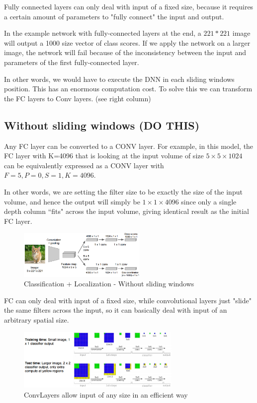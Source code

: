 Fully connected layers can only deal with input of a fixed size, because it requires a certain amount of parameters to "fully connect" the input and output.

In the example network with fully-connected layers at the end, a $221*221$ image will output a 1000 size vector of class scores. If we apply the network on a larger image, the network will fail because of the inconsistency between the input and parameters of the first fully-connected layer.

In other words, we would have to execute the DNN in each sliding windows position. This has an enormous computation cost. To solve this we can transform the FC layers to Conv layers. (see right column)

\subsection*{Without sliding windows (DO THIS)}

Any FC layer can be converted to a CONV layer. For example, in this model, the FC layer with K=4096 that is looking at the input volume of size $5 \times 5 \times 1024$ can be equivalently expressed as a CONV layer with $F=5,P=0,S=1,K=4096$.

In other words, we are setting the filter size to be exactly the size of the input volume, and hence the output will simply be $1 \times 1 \times 4096$ since only a single depth column ``fits" across the input volume, giving identical result as the initial FC layer.

\begin{figure}[h]
  \centering
  \includegraphics[width=0.55\textwidth]{Images/applications/9.png}
  \caption{Classification + Localization - Without sliding windows}
\end{figure}

FC can only deal with input of a fixed size, while convolutional layers just "slide" the same filters across the input, so it can basically deal with input of an arbitrary spatial size.

\begin{figure}[h]
  \centering
  \includegraphics[width=0.7\textwidth]{Images/applications/10.png}
  \caption{ConvLayers allow input of any size in an efficient way}
\end{figure}

